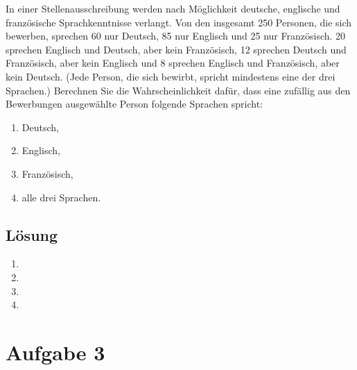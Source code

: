 \documentclass{exercise}
\begin{document}
    \begin{problem}
        In einer Stellenausschreibung werden nach Möglichkeit deutsche, englische und französische Sprachkenntnisse verlangt.
        Von den insgesamt 250 Personen, die sich bewerben, sprechen 60 nur Deutsch, 85 nur Englisch und 25 nur Französisch.
        20 sprechen Englisch und Deutsch, aber kein Französisch, 12 sprechen Deutsch und Französisch, aber kein Englisch und 8 sprechen Englisch und Französisch, aber kein Deutsch.
        (Jede Person, die sich bewirbt, spricht mindestens eine der drei Sprachen.)
        Berechnen Sie die Wahrscheinlichkeit dafür, dass eine zufällig aus den Bewerbungen ausgewählte Person folgende Sprachen spricht:
        \begin{enumerate}
            \item Deutsch,
            \item Englisch,
            \item Französisch,
            \item alle drei Sprachen.
        \end{enumerate}
    \end{problem}

    \subsection*{Lösung}
    \begin{enumerate}
        \item
        \item
        \item
        \item 
    \end{enumerate}


    \section*{Aufgabe 3}
\end{document}
